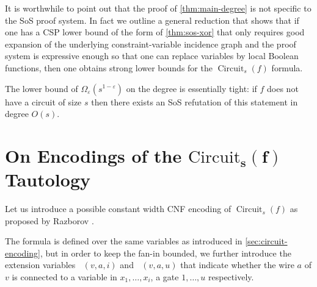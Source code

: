\documentclass[10pt,a4paper]{article}
\theoremstyle{plain}
\theoremstyle{remark}
\theoremstyle{definition}
\newcommand{\eps}{\varepsilon}
\newcommand{\vars}[1]{\mathsf{#1}}
\DeclareMathOperator{\circuit}{Circuit}
\DeclareMathOperator{\isvarless}{\vars{IsInput^{\le}}}
\DeclareMathOperator{\isgateless}{\vars{IsGate^{\le}}}
\begin{document}
It is worthwhile to point out that the proof of \cref{thm:main-degree}
is not specific to the SoS proof system. In fact we outline a general
reduction that shows that if one has a CSP lower bound of the form of
\cref{thm:sos-xor} that only requires good expansion of the underlying
constraint-variable incidence graph and the proof system is expressive
enough so that one can replace variables by local Boolean functions,
then one obtains strong lower bounds for the $\circuit_s(f)$ formula.

The lower bound of $\Omega_\eps(s^{1-\eps})$ on the degree is
essentially tight: if $f$ does not have a circuit of size $s$ then
there exists an SoS refutation of this statement in degree $O(s)$.

\section[On Encodings of the $\circuit_s(f)$ Tautology]{On Encodings
  of the $\bm{\mathrm{Circuit}_s(f)}$ Tautology}
\label{sec:encoding}

Let us introduce a possible constant width CNF encoding of
$\circuit_s(f)$ as proposed by Razborov \cite{Razborov98}.

The formula is defined over the same variables as introduced in
\cref{sec:circuit-encoding}, but in order to keep the fan-in bounded,
we further introduce the extension variables $\isvarless(v, a, i)$ and
$\isgateless(v, a, u)$ that indicate whether the wire $a$ of $v$ is
connected to a variable in $x_1, \ldots, x_i$, a gate $1, \ldots, u$
respectively.
\end{document}
